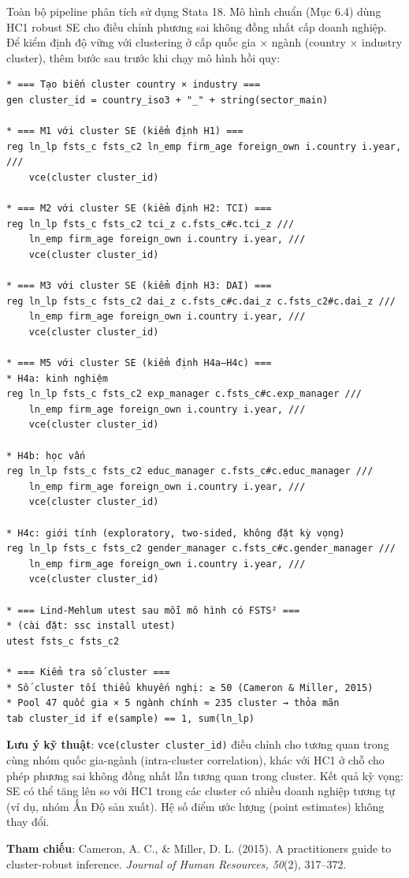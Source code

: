 \documentclass[12pt,a4paper]{article}
\begin{document}
Toàn bộ pipeline phân tích sử dụng Stata 18. Mô hình chuẩn (Mục 6.4)
dùng HC1 robust SE cho điều chỉnh phương sai không đồng nhất cấp doanh
nghiệp. Để kiểm định độ vững với clustering ở cấp quốc gia × ngành
(country × industry cluster), thêm bước sau trước khi chạy mô hình hồi
quy:

\begin{verbatim}
* === Tạo biến cluster country × industry ===
gen cluster_id = country_iso3 + "_" + string(sector_main)

* === M1 với cluster SE (kiểm định H1) ===
reg ln_lp fsts_c fsts_c2 ln_emp firm_age foreign_own i.country i.year, ///
    vce(cluster cluster_id)

* === M2 với cluster SE (kiểm định H2: TCI) ===
reg ln_lp fsts_c fsts_c2 tci_z c.fsts_c#c.tci_z ///
    ln_emp firm_age foreign_own i.country i.year, ///
    vce(cluster cluster_id)

* === M3 với cluster SE (kiểm định H3: DAI) ===
reg ln_lp fsts_c fsts_c2 dai_z c.fsts_c#c.dai_z c.fsts_c2#c.dai_z ///
    ln_emp firm_age foreign_own i.country i.year, ///
    vce(cluster cluster_id)

* === M5 với cluster SE (kiểm định H4a–H4c) ===
* H4a: kinh nghiệm
reg ln_lp fsts_c fsts_c2 exp_manager c.fsts_c#c.exp_manager ///
    ln_emp firm_age foreign_own i.country i.year, ///
    vce(cluster cluster_id)

* H4b: học vấn
reg ln_lp fsts_c fsts_c2 educ_manager c.fsts_c#c.educ_manager ///
    ln_emp firm_age foreign_own i.country i.year, ///
    vce(cluster cluster_id)

* H4c: giới tính (exploratory, two-sided, không đặt kỳ vọng)
reg ln_lp fsts_c fsts_c2 gender_manager c.fsts_c#c.gender_manager ///
    ln_emp firm_age foreign_own i.country i.year, ///
    vce(cluster cluster_id)

* === Lind-Mehlum utest sau mỗi mô hình có FSTS² ===
* (cài đặt: ssc install utest)
utest fsts_c fsts_c2

* === Kiểm tra số cluster ===
* Số cluster tối thiểu khuyến nghị: ≥ 50 (Cameron & Miller, 2015)
* Pool 47 quốc gia × 5 ngành chính ≈ 235 cluster → thỏa mãn
tab cluster_id if e(sample) == 1, sum(ln_lp)
\end{verbatim}

\textbf{Lưu ý kỹ thuật}: \texttt{vce(cluster\ cluster\_id)} điều chỉnh
cho tương quan trong cùng nhóm quốc gia-ngành (intra-cluster
correlation), khác với HC1 ở chỗ cho phép phương sai không đồng nhất lẫn
tương quan trong cluster. Kết quả kỳ vọng: SE có thể tăng lên so với HC1
trong các cluster có nhiều doanh nghiệp tương tự (ví dụ, nhóm Ấn Độ sản
xuất). Hệ số điểm ước lượng (point estimates) không thay đổi.

\textbf{Tham chiếu}: Cameron, A. C., \& Miller, D. L. (2015). A
practitioner\textquotesingle s guide to cluster-robust inference.
\emph{Journal of Human Resources, 50}(2), 317--372.
\end{document}
